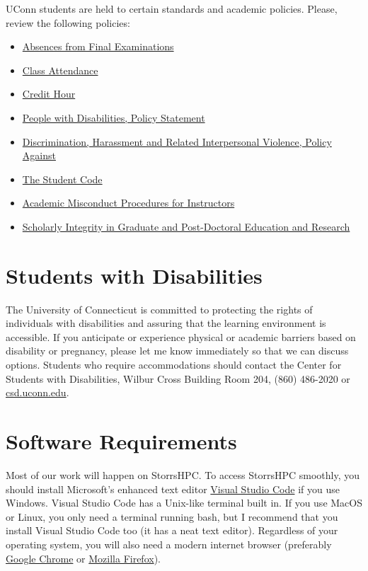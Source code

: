 \documentclass[11pt]{article}
\begin{document}
UConn students are held to certain standards and academic policies. Please, review the following policies: 
\begin{itemize}
	\item \href{https://catalog.uconn.edu/academic-regulations/grade-information/#exam-absence}{Absences from Final Examinations}
	\item \href{https://catalog.uconn.edu/academic-regulations/grade-information/#attendance}{Class Attendance}
	\item \href{https://policy.uconn.edu/2012/08/22/credit-hour/}{Credit Hour}
	\item \href{https://policy.uconn.edu/2011/05/24/people-with-disabilities-policy-statement/}{People with Disabilities, Policy Statement}
	\item \href{https://policy.uconn.edu/2015/12/29/policy-against-discrimination-harassment-and-related-interpersonal-violence/}{Discrimination, Harassment and Related Interpersonal Violence, Policy Against}
	\item \href{https://community.uconn.edu/the-student-code-preamble/}{The Student Code}
	\item \href{https://community.uconn.edu/academic-misconduct-procedure-review/}{Academic Misconduct Procedures for Instructors}
	\item \href{https://policy.uconn.edu/2014/04/11/policy-on-scholarly-integrity-in-graduate-education-and-research/}{Scholarly Integrity in Graduate and Post-Doctoral Education and Research}
\end{itemize}

\section*{Students with Disabilities}

The University of Connecticut is committed to protecting the rights of individuals with disabilities and assuring that the learning environment is accessible. If you anticipate or experience physical or academic barriers based on disability or pregnancy, please let me know immediately so that we can discuss options. Students who require accommodations should contact the Center for Students with Disabilities, Wilbur Cross Building Room 204, (860) 486-2020 or \href{http://csd.uconn.edu}{csd.uconn.edu}.

\section*{Software Requirements}
Most of our work will happen on StorrsHPC. To access StorrsHPC smoothly, you should install Microsoft's enhanced text editor \href{https://code.visualstudio.com}{Visual Studio Code} if you use Windows. Visual Studio Code has a Unix-like terminal built in. If you use MacOS or Linux, you only need a terminal running bash, but I recommend that you install Visual Studio Code too (it has a neat text editor). Regardless of your operating system, you will also need a modern internet browser (preferably \href{https://www.google.com/chrome/}{Google Chrome} or  \href{https://www.mozilla.org/en-US/firefox/new/}{Mozilla Firefox}).
\end{document}
